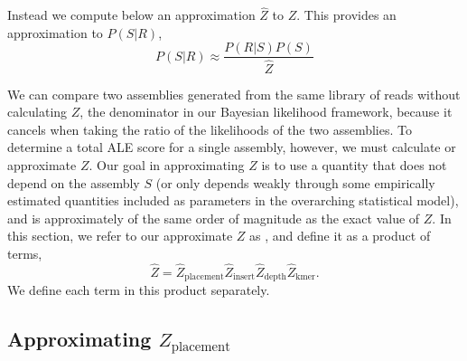 \documentclass[phd,tocprelim]{cornell}
\begin{document}
Instead we compute below an approximation $\hat{Z}$ to $Z$.  This provides an approximation to $P(S|R)$,
\begin{equation}
    P(S|R) \approx \frac{P(R|S)P(S)}{\hat{Z}}
\end{equation}

We can compare two assemblies generated from the same library of reads without calculating $Z$, the denominator in our Bayesian likelihood framework, because it cancels when taking the ratio of the likelihoods of the two assemblies. To determine a total ALE score for a single assembly, however, we must calculate or approximate $Z$. Our goal in approximating $Z$ is to use a quantity that does not depend on the assembly $S$ (or only depends weakly through some empirically estimated quantities included as parameters in the overarching statistical model), and is approximately of the same order of magnitude as the exact value of $Z$.  In this section, we refer to our approximate $Z$ as  , and define it as a product of terms,
\begin{equation}
    \hat{Z} = \hat{Z}_{\text{placement}}\hat{Z}_{\text{insert}}\hat{Z}_{\text{depth}}\hat{Z}_{\text{kmer}}.
\end{equation}
We define each term in this product separately.

\subsection{Approximating $Z_{\text{placement}}$} %
\label{sub:Aprroximating Z_placement}
\end{document}
